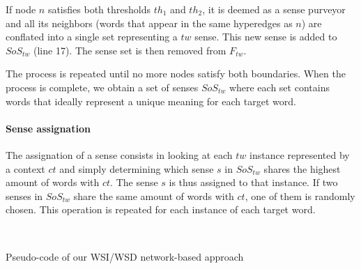 If node $n$ satisfies both thresholds $th_1$ and $th_2$, it is deemed as a sense purveyor and all its neighbors (words that appear in the same hyperedges as $n$) are conflated into a single set representing a $tw$ sense. This new sense is added to $SoS_{tw}$ (line 17). The sense set is then removed from $F_{tw}$.

The process is repeated until no more nodes satisfy both boundaries. When the process is complete, we obtain a set of senses $SoS_{tw}$ where each set contains words that ideally represent a unique meaning for each target word. 

\paragraph{Sense assignation}

The assignation of a sense consists in looking at each $tw$ instance represented by a context $ct$ and simply determining which sense $s$ in $SoS_{tw}$ shares the highest amount of words with $ct$. The sense $s$ is thus assigned to that instance. If two senses in $SoS_{tw}$ share the same amount of words with $ct$, one of them is randomly chosen.  This operation is repeated for each instance of each target word. 


~

\begin{algorithm}[]
\SetAlgoLined
{}


\caption{Pseudo-code of our WSI/WSD network-based approach}
\label{alg:wsd}
\end{algorithm}

